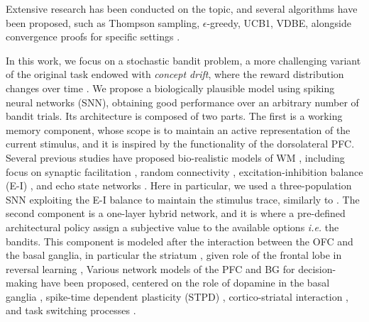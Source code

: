 Extensive research has been conducted on the topic, and several algorithms have been proposed, such as Thompson sampling, $\epsilon$-greedy, UCB1, VDBE, alongside convergence proofs for specific settings \cite{gittinsBanditProcessesDynamic1979, kaufmannThompsonSamplingAsymptotically2012, banMultifacetContextualBandits2021, tokicAdaptiveEGreedyExploration2010, tokicValueDifferenceBasedExploration2011}.

In this work, we focus on a stochastic bandit problem, a more challenging variant of the original task endowed with \textit{concept drift}, where the reward distribution changes over time \cite{garivierUpperConfidenceBoundPolicies2008, besbesStochasticMultiArmedBanditProblem2014, cavenaghiNonStationaryMultiArmed2021}.
We propose a biologically plausible model using spiking neural networks (SNN), obtaining good performance over an arbitrary number of bandit trials.
Its architecture is composed of two parts. The first is a working memory component, whose scope is to maintain an active representation of the current stimulus, and it is inspired by the functionality of the dorsolateral PFC. Several previous studies have proposed bio-realistic models of WM
\cite{barakWorkingModelsWorking2014}, including focus on synaptic facilitation \cite{barakNeuronalPopulationCoding2010}, random connectivity \cite{bouchacourtFlexibleModelWorking2019}, excitation-inhibition balance (E-I)
\cite{brunelEffectsNeuromodulationCortical2001, vogelsGatingMultipleSignals2009}, and echo state networks \cite{pascanuNeurodynamicalModelWorking2011, fetteShortTermMemory2005}. Here in particular, we used a three-population SNN exploiting the E-I balance to maintain the stimulus trace, similarly to
\cite{chenSpikingNeuralNetwork2023}.
The second component is a one-layer hybrid network, and it is where a pre-defined architectural policy assign a subjective value to the available options \textit{i.e.} the bandits.
This component is modeled after the interaction between the OFC and the basal ganglia, in particular the striatum
\cite{bariDynamicDecisionMaking2021, frankAnatomyDecisionStriatoorbitofrontal2006}, given role of the frontal lobe in reversal learning \cite{bartoloPrefrontalCortexPredicts2020},
Various network models of the PFC and BG for decision-making have been proposed, centered on the role of dopamine in the basal ganglia \cite{bastonBiologicallyInspiredComputational2015}, spike-time dependent plasticity (STPD) \cite{kannanUnsupervisedSpikingNeural2023}, cortico-striatal interaction
\cite{frankInteractionsFrontalCortex2001}, and task switching processes \cite{zhaoBrainInspiredDecisionMakingSpiking2018, herdNeuralNetworkModel2014}.

